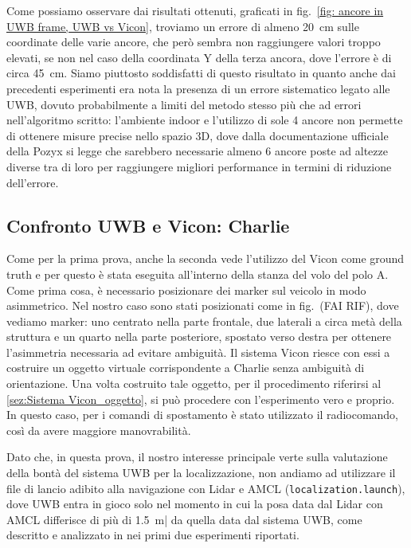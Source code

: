 Come possiamo osservare dai risultati ottenuti, graficati in fig.~\ref{fig: ancore in UWB frame, UWB vs Vicon}, troviamo un errore di almeno \SI{20}{\centi \metre} sulle coordinate delle varie ancore, che però sembra non raggiungere valori troppo elevati, se non nel caso della coordinata Y della terza ancora, dove l'errore è di circa 
\SI{45}{\centi \metre}. Siamo piuttosto soddisfatti di questo risultato in quanto anche dai precedenti esperimenti era nota la presenza di un errore sistematico legato alle 
UWB, dovuto probabilmente a limiti del metodo stesso più che ad errori nell'algoritmo scritto: l'ambiente indoor e l'utilizzo di sole 4 ancore non permette di ottenere
misure precise nello spazio 3D, dove dalla documentazione ufficiale della Pozyx si legge che sarebbero necessarie almeno 6 ancore poste ad altezze diverse tra di loro 
per raggiungere migliori performance in termini di riduzione dell'errore.                                                  

\subsection{Confronto UWB e Vicon: Charlie}

Come per la prima prova, anche la seconda vede l'utilizzo del Vicon come ground truth e per questo è stata eseguita all'interno della stanza del volo del polo A.
Come prima cosa, è necessario posizionare dei marker sul veicolo in modo asimmetrico. Nel nostro caso sono stati posizionati come in fig.~(FAI RIF), dove vediamo 
marker: uno centrato nella parte frontale, due laterali a circa metà della struttura e un quarto nella parte posteriore, spostato verso destra per ottenere 
l'asimmetria necessaria ad evitare ambiguità. Il sistema Vicon riesce con essi a costruire un oggetto virtuale corrispondente a Charlie senza ambiguità di orientazione. 
Una volta costruito tale oggetto, per il procedimento riferirsi al \ref{sez:Sistema Vicon_oggetto}, si può procedere con l'esperimento vero e proprio. In questo caso, 
per i comandi di spostamento è stato utilizzato il radiocomando, così da avere maggiore manovrabilità.

Dato che, in questa prova, il nostro interesse principale verte sulla valutazione della bontà del sistema UWB per la localizzazione, non andiamo ad utilizzare il file
di lancio adibito alla navigazione con Lidar e AMCL (\verb|localization.launch|), dove UWB entra in gioco solo nel momento in cui la posa data dal Lidar con AMCL differisce di più di \SI{1.5}{\metre}| da quella data dal sistema UWB, come descritto e analizzato in \cite{ptvlocalizzazione} nei primi due esperimenti riportati. 
 
